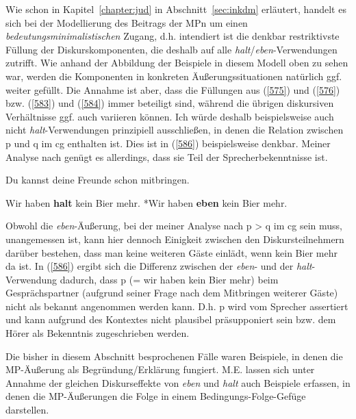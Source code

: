 Wie schon in Kapitel~\ref{chapter:jud} in Abschnitt~\ref{sec:inkdm} erläutert, handelt es sich bei der Mo\-dellierung des Beitrags der MPn um einen \textit{bedeutungsminimalistischen} Zugang, d.h. intendiert ist die denkbar restriktivste Füllung der Diskurskomponenten, die des\-halb auf alle \textit{halt}/\textit{eben}-Verwendungen zutrifft. Wie anhand der Abbildung der Beispiele in diesem Modell oben zu sehen war, werden die Komponenten in konkreten Äußerungssituationen natürlich ggf. weiter gefüllt. Die Annahme ist aber, dass die Füllungen aus (\ref{575}) und (\ref{576}) bzw. (\ref{583}) und (\ref{584}) immer beteiligt sind, während die übrigen diskursiven Verhältnisse ggf. auch variieren können. Ich würde deshalb beispielsweise auch nicht \textit{halt}-Verwendungen prinzipiell aus\-schließen, in denen die Relation zwischen p und q im cg enthalten ist. Dies ist in (\ref{586}) beispielsweise denkbar. Meiner Analyse nach genügt es allerdings, dass sie Teil der Sprecherbekenntnisse ist.	

\begin{exe}
	\ex\label{586} Du kannst deine Freunde schon mitbringen.
		\begin{xlist}	
			\ex\label{586a} Wir haben \textbf{halt} kein Bier mehr.
			\ex\label{586b} *Wir haben \textbf{eben} kein Bier mehr. 
		\end{xlist}
\end{exe}\largerpage[2]
Obwohl die \textit{eben}-Äußerung, bei der meiner Analyse nach p > q im cg sein muss, unangemessen ist, kann hier dennoch Einigkeit zwischen den Diskursteilnehmern darüber bestehen, dass man keine weiteren Gäste einlädt, wenn kein Bier mehr da ist. In (\ref{586}) ergibt sich die Differenz zwischen der \textit{eben}- und der \textit{halt}-Verwendung dadurch, dass p (= wir haben kein Bier mehr) beim Gesprächspartner (aufgrund seiner Frage nach dem Mitbringen weiterer Gäste) nicht als bekannt angenommen werden kann. D.h. p wird vom Sprecher assertiert  und kann aufgrund des Kontextes nicht plausibel präsupponiert  sein bzw. dem Hörer als Bekenntnis zugeschrieben werden.

Die bisher in diesem Abschnitt besprochenen Fälle waren Beispiele, in denen die MP-Äußerung als Begründung/Erklärung fungiert. M.E. lassen sich unter Annahme der gleichen Diskurseffekte von \textit{eben} und \textit{halt} auch Beispiele erfassen, in denen die MP-Äußerungen die Folge in einem Bedingungs-Folge-Gefüge  darstellen.


